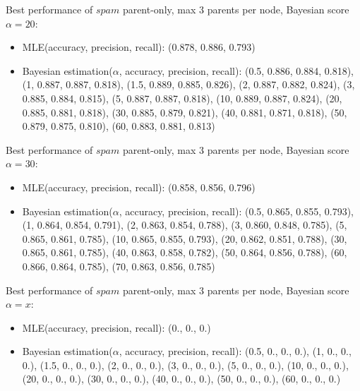 \documentclass[english,cover]{fitthesis} %
\newcommand{\todo}[1]{{\color{red}#1}}
\begin{document}
{Best performance of $spam$ parent-only, max 3 parents per node, Bayesian score $\alpha=20$:
\begin{itemize}
    \item MLE(accuracy, precision, recall): (0.878, 0.886, 0.793)
    \item Bayesian estimation($\alpha$, accuracy, precision, recall): (0.5, 0.886, 0.884, 0.818), (1, 0.887, 0.887, 0.818), (1.5, 0.889, 0.885, 0.826), (2, 0.887, 0.882, 0.824), (3, 0.885, 0.884, 0.815), (5, 0.887, 0.887, 0.818), (10, 0.889, 0.887, 0.824), (20, 0.885, 0.881, 0.818), (30, 0.885, 0.879, 0.821), (40, 0.881, 0.871, 0.818), (50, 0.879, 0.875, 0.810), (60, 0.883, 0.881, 0.813)
\end{itemize}

Best performance of $spam$ parent-only, max 3 parents per node, Bayesian score $\alpha=30$:
\begin{itemize}
    \item MLE(accuracy, precision, recall): (0.858, 0.856, 0.796)
    \item Bayesian estimation($\alpha$, accuracy, precision, recall): (0.5, 0.865, 0.855, 0.793), (1, 0.864, 0.854, 0.791), (2, 0.863, 0.854, 0.788), (3, 0.860, 0.848, 0.785), (5, 0.865, 0.861, 0.785), (10, 0.865, 0.855, 0.793), (20, 0.862, 0.851, 0.788), (30, 0.865, 0.861, 0.785), (40, 0.863, 0.858, 0.782), (50, 0.864, 0.856, 0.788), (60, 0.866, 0.864, 0.785), (70, 0.863, 0.856, 0.785)
\end{itemize}

Best performance of $spam$ parent-only, max 3 parents per node, Bayesian score $\alpha=x$:
\begin{itemize}
    \item MLE(accuracy, precision, recall): (0., 0., 0.)
    \item Bayesian estimation($\alpha$, accuracy, precision, recall): (0.5, 0., 0., 0.), (1, 0., 0., 0.), (1.5, 0., 0., 0.), (2, 0., 0., 0.), (3, 0., 0., 0.), (5, 0., 0., 0.), (10, 0., 0., 0.), (20, 0., 0., 0.), (30, 0., 0., 0.), (40, 0., 0., 0.), (50, 0., 0., 0.), (60, 0., 0., 0.)
\end{itemize}
}

\end{document}
